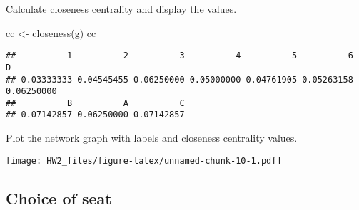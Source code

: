 \documentclass[
]{article}
\newenvironment{Shaded}{\begin{snugshade}}{\end{snugshade}}
\newcommand{\AttributeTok}[1]{\textcolor[rgb]{0.77,0.63,0.00}{#1}}
\newcommand{\CommentTok}[1]{\textcolor[rgb]{0.56,0.35,0.01}{\textit{#1}}}
\newcommand{\DecValTok}[1]{\textcolor[rgb]{0.00,0.00,0.81}{#1}}
\newcommand{\FloatTok}[1]{\textcolor[rgb]{0.00,0.00,0.81}{#1}}
\newcommand{\FunctionTok}[1]{\textcolor[rgb]{0.00,0.00,0.00}{#1}}
\newcommand{\NormalTok}[1]{#1}
\newcommand{\OtherTok}[1]{\textcolor[rgb]{0.56,0.35,0.01}{#1}}
\newcommand{\SpecialCharTok}[1]{\textcolor[rgb]{0.00,0.00,0.00}{#1}}
\newcommand{\StringTok}[1]{\textcolor[rgb]{0.31,0.60,0.02}{#1}}
\begin{document}
Calculate closeness centrality and display the values.

\begin{Shaded}
\begin{Highlighting}[]
\NormalTok{cc }\OtherTok{\textless{}{-}} \FunctionTok{closeness}\NormalTok{(g)}
\NormalTok{cc}
\end{Highlighting}
\end{Shaded}

\begin{verbatim}
##          1          2          3          4          5          6          D 
## 0.03333333 0.04545455 0.06250000 0.05000000 0.04761905 0.05263158 0.06250000 
##          B          A          C 
## 0.07142857 0.06250000 0.07142857
\end{verbatim}

Plot the network graph with labels and closeness centrality values.

\begin{Shaded}
\end{Shaded}

\texttt{[image: HW2\_files/figure-latex/unnamed-chunk-10-1.pdf]}

\hypertarget{choice-of-seat}{%
\subsection{Choice of seat}\label{choice-of-seat}}
\end{document}
